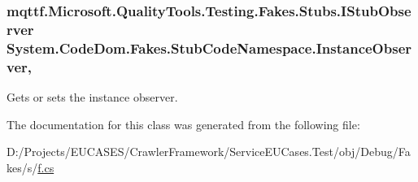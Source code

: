 \hypertarget{class_system_1_1_code_dom_1_1_fakes_1_1_stub_code_namespace_a63e078dbb68b80aeb07a189cc1cbc9e9}{
\subsubsection[{Instance\-Observer}]{\setlength{\rightskip}{0pt plus 5cm}mqttf.\-Microsoft.\-Quality\-Tools.\-Testing.\-Fakes.\-Stubs.\-I\-Stub\-Observer System.\-Code\-Dom.\-Fakes.\-Stub\-Code\-Namespace.\-Instance\-Observer\hspace{0.3cm}{\ttfamily [get]}, {\ttfamily [set]}}}\label{class_system_1_1_code_dom_1_1_fakes_1_1_stub_code_namespace_a63e078dbb68b80aeb07a189cc1cbc9e9}


Gets or sets the instance observer.



The documentation for this class was generated from the following file\-:\begin{DoxyCompactItemize}
\item 
D\-:/\-Projects/\-E\-U\-C\-A\-S\-E\-S/\-Crawler\-Framework/\-Service\-E\-U\-Cases.\-Test/obj/\-Debug/\-Fakes/s/\hyperlink{s_2f_8cs}{f.\-cs}\end{DoxyCompactItemize}
